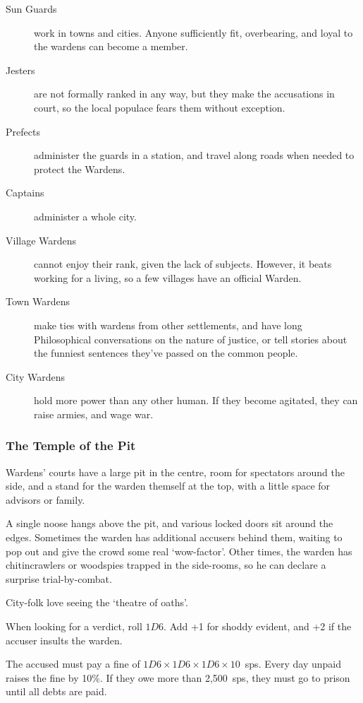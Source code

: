 \begin{multicols}{2}
\begin{description}
  \item[Sun Guards]
  work in towns and cities.
  Anyone sufficiently fit, overbearing, and loyal to the wardens can become a member.
  \item[Jesters]
  are not formally ranked in any way, but they make the accusations in court, so the local populace fears them without exception.
  \item[Prefects]
  administer the guards in a station, and travel along roads when needed to protect the Wardens.
  \item[Captains]
  administer a whole city.
  \item[Village Wardens]
  cannot enjoy their rank, given the lack of subjects.
  However, it beats working for a living, so a few villages have an official Warden.
  \item[Town Wardens]
  make ties with wardens from other settlements, and have long Philosophical conversations on the nature of justice, or tell stories about the funniest sentences they've passed on the common people.
  \item[City Wardens]
  hold more power than any other human.
  If they become agitated, they can raise armies, and wage war.
\end{description}

\subsubsection{The Temple of the Pit}

Wardens' courts have a large pit in the centre, room for spectators around the side, and a stand for the warden themself at the top, with a little space for advisors or family.

A single noose hangs above the pit, and various locked doors sit around the edges.
Sometimes the warden has additional accusers behind them, waiting to pop out and give the crowd some real `wow-factor'.
Other times, the warden has chitincrawlers or woodspies trapped in the side-rooms, so he can declare a surprise trial-by-combat.

City-folk love seeing the `theatre of oaths'.

When looking for a verdict, roll $1D6$.
Add +1 for shoddy evident, and +2 if the accuser insults the warden.

\begin{dlist}
  \item
  The accused must pay a fine of $1D6\times 1D6\times 1D6\times 10$~\glspl{sp}.
  Every day unpaid raises the fine by 10\%.
  If they owe more than 2,500~\glspl{sp}, they must go to prison until all debts are paid.


\end{dlist}
\end{multicols}
